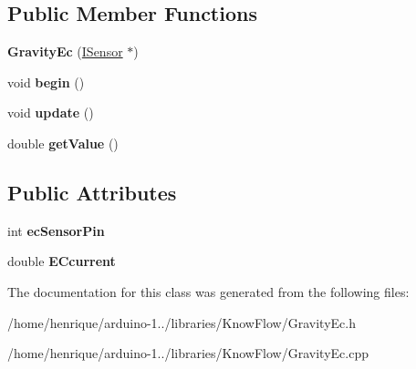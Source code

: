 \subsection*{Public Member Functions}
\begin{DoxyCompactItemize}
\item 
{\bfseries Gravity\+Ec} (\hyperlink{class_i_sensor}{I\+Sensor} $\ast$)\hypertarget{class_gravity_ec_a6907e34720f011cf7eed6a99c93ab66f}{}\label{class_gravity_ec_a6907e34720f011cf7eed6a99c93ab66f}

\item 
void {\bfseries begin} ()\hypertarget{class_gravity_ec_aab0f65470fdff7fb4465ecbbf57556a1}{}\label{class_gravity_ec_aab0f65470fdff7fb4465ecbbf57556a1}

\item 
void {\bfseries update} ()\hypertarget{class_gravity_ec_a8e0463b6147cfbcbc1488dd1614141c7}{}\label{class_gravity_ec_a8e0463b6147cfbcbc1488dd1614141c7}

\item 
double {\bfseries get\+Value} ()\hypertarget{class_gravity_ec_ac7307196ab402c5a65cbc8beb9dd7399}{}\label{class_gravity_ec_ac7307196ab402c5a65cbc8beb9dd7399}

\end{DoxyCompactItemize}
\subsection*{Public Attributes}
\begin{DoxyCompactItemize}
\item 
int {\bfseries ec\+Sensor\+Pin}\hypertarget{class_gravity_ec_a79c99fcfced63d1e170a5ed3fbf0146e}{}\label{class_gravity_ec_a79c99fcfced63d1e170a5ed3fbf0146e}

\item 
double {\bfseries E\+Ccurrent}\hypertarget{class_gravity_ec_a55b65815e70813e52e8dd66fc6db147b}{}\label{class_gravity_ec_a55b65815e70813e52e8dd66fc6db147b}

\end{DoxyCompactItemize}


The documentation for this class was generated from the following files\+:\begin{DoxyCompactItemize}
\item 
/home/henrique/arduino-\/1../libraries/\+Know\+Flow/Gravity\+Ec.\+h\item 
/home/henrique/arduino-\/1../libraries/\+Know\+Flow/Gravity\+Ec.\+cpp\end{DoxyCompactItemize}

